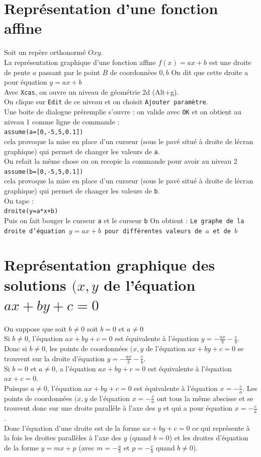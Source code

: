 \documentclass[a4paper,11pt]{book}
\begin{document}
\section{Repr\'esentation d'une fonction affine}
Soit un rep\`ere orthonorm\'e $Oxy$.\\
La repr\'esentation  graphique d'une fonction affine $f(x)=ax+b$ est une droite
de pente $a$ passant par le point $B$ de coordonn\`ees $0,b$
On dit que cette droite a pour \'equation $y=ax+b$\\
Avec {\tt Xcas}, on ouvre un niveau de g\'eom\'etrie 2d (Alt+g).\\
On clique sur {\tt Edit} de ce niveau et on choisit {\tt Ajouter param\`etre}.\\
Une boite de dialogue pr\'eremplie s'ouvre : on valide avec {\tt OK} et on 
obtient au niveau 1 comme ligne de commande :\\
{\tt assume(a=[0,-5,5,0.1])}\\
cela provoque la mise en place d'un curseur (sous le pav\'e situ\'e \`a 
droite de l\'ecran graphique) qui permet de changer les valeurs de {\tt a}.\\
On refait la m\^eme chose ou on recopie la commande pour avoir au niveau 2
{\tt assume(b=[0,-5,5,0.1])}\\
cela provoque la mise en place d'un curseur (sous le pav\'e situ\'e \`a 
droite de l\'ecran graphique) qui permet de changer les valeurs de {\tt b}.\\
On tape :\\
{\tt droite(y=a*x+b)}\\
Puis on fait bouger le curseur {\tt a} et le curseur {\tt b}
On obtient : {\tt Le graphe de la droite d'\'equation $y=ax+b$ pour 
diff\'erentes valeurs de $a$ et de $b$}\\
\section{Repr\'esentation graphique des solutions $(x,y$ de l'\'equation
$ax+by+c=0$}
On suppose que soit $b\neq 0$ soit  $b=0$ et $a\neq 0$\\
Si $b\neq 0$, l'\'equation $ax+by+c=0$ est \'equivalente \`a l'\'equation 
$\displaystyle y=-\frac{ax}{b}-\frac{c}{b}$.\\
Donc si $b\neq 0$, les points de coordonn\'ees $(x,y$ de l'\'equation 
$ax+by+c=0$ se trouvent sur la droite d'\'equation 
$\displaystyle y=-\frac{ax}{b}-\frac{c}{b}$.\\
Si $b= 0$ et $a\neq 0$, a l'\'equation $ax+by+c=0$ est \'equivalente \`a 
l'\'equation $ax+c=0$.\\
Puisque $a\neq 0$, l'\'equation $ax+by+c=0$ est \'equivalente \`a l'\'equation 
$\displaystyle x=-\frac{c}{a}$. Les points de coordonn\'ees $(x,y$ de 
l'\'equation $\displaystyle x=-\frac{c}{a}$ ont tous la m\^eme abscisse et 
se trouvent donc sur une droite parall\`ele \`a l'axe des $y$ et qui a pour 
\'equation $\displaystyle x=-\frac{c}{a}$.\\
Donc l'\'equation d'une droite est de la forme $ax+by+c=0$ ce qui repr\'esente 
\`a la fois les droites parall\`eles \`a l'axe des $y$ (quand $b=0$) et les 
droites d'\'equation de la forme $y=mx+p$ (avec $m=-\frac{a}{b}$ et 
$p=-\frac{c}{b}$ quand $b\neq 0$).
\end{document}
